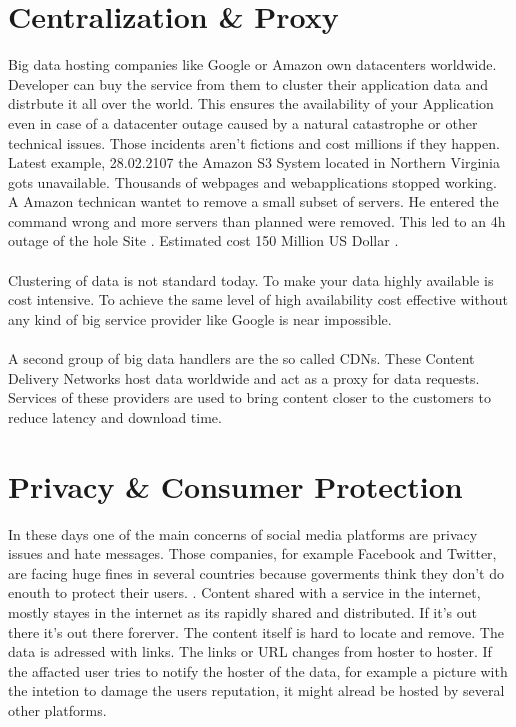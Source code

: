 \documentclass[a4paper,11pt, oneside]{report}
\theoremstyle{definition}
\begin{document}
\section{Centralization \& Proxy}
Big data hosting companies like Google or Amazon own datacenters worldwide. Developer can buy the service from them to cluster their application data  and distrbute it all over the world. This ensures the availability of your Application even in case of a datacenter outage caused by a natural catastrophe or other technical issues. Those incidents aren't fictions and cost millions if they happen. Latest example, 28.02.2107 the Amazon S3 System located in Northern Virginia gots unavailable. Thousands of webpages and webapplications stopped working. A Amazon technican wantet to remove a small subset of servers. He entered the command wrong and more servers than planned were removed. This led to an 4h outage of the hole Site \cite{AWSOutage}. Estimated cost 150 Million US Dollar \cite{AWSOutageCost}.\\\\
Clustering of data is not standard today. To make your data highly available is cost intensive. To achieve the same level of high availability cost effective without any kind of big service provider like Google is near impossible.\\\\
A second group of big data handlers are the so called CDNs. These Content Delivery Networks host data worldwide and act as a proxy for data requests. Services of these providers are used to bring content closer to the customers to reduce latency and download time.

\section{Privacy \& Consumer Protection}
In these days one of the main concerns of social media platforms are privacy issues and hate messages. Those companies, for example Facebook and Twitter, are facing huge fines in several countries because goverments think they don't do enouth to protect their users. \cite{HateSpeech}. Content shared with a service in the internet, mostly stayes in the internet as its rapidly shared and distributed. If it's out there it's out there forerver. The content itself is hard to locate and remove. The data is adressed with links. The links or URL changes from hoster to hoster. If the affacted user tries to notify the hoster of the data, for example a picture with the intetion to damage the users reputation, it might alread be hosted by several other platforms.
\end{document}
